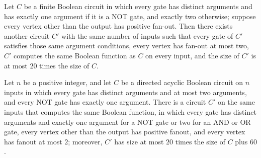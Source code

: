 \begin{theorem}
\label{BoolCircuit.DAGCircuit.IsStrict.exists_fanoutTwo}
\leanok
{}
Let $C$ be a finite Boolean circuit in which every gate has distinct arguments and has
exactly one argument if it is a NOT gate, and exactly two otherwise; suppose every
vertex other than the output has positive fan-out. Then there exists another circuit
$C'$ with the same number of inputs such that every gate of $C'$ satisfies those same
argument conditions, every vertex has fan-out at most two, $C'$ computes the same
Boolean function as $C$ on every input, and the size of $C'$ is at most $20$ times the
size of $C$.
\end{theorem}

\begin{theorem}
\label{BoolCircuit.DAGCircuit.exists_isStrict_fanoutTwo}
\leanok
{}
Let $n$ be a positive integer, and let $C$ be a directed acyclic Boolean circuit on $n$
inputs in which every gate has distinct arguments and at most two arguments, and every
NOT gate has exactly one argument. There is a circuit $C'$ on the same inputs that
computes the same Boolean function, in which every gate has distinct arguments and
exactly one argument for a NOT gate or two for an AND or OR gate, every vertex other
than the output has positive fanout, and every vertex has fanout at most $2$; moreover,
$C'$ has size at most $20$ times the size of $C$ plus $60$.
\end{theorem}
